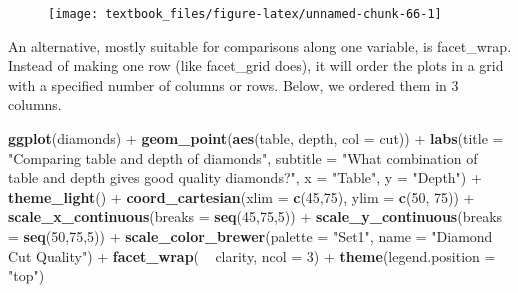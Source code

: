 \documentclass[]{tufte-book}
\newenvironment{Shaded}{}{}
\newcommand{\DataTypeTok}[1]{\textcolor[rgb]{0.56,0.13,0.00}{#1}}
\newcommand{\DecValTok}[1]{\textcolor[rgb]{0.25,0.63,0.44}{#1}}
\newcommand{\KeywordTok}[1]{\textcolor[rgb]{0.00,0.44,0.13}{\textbf{#1}}}
\newcommand{\NormalTok}[1]{#1}
\newcommand{\OperatorTok}[1]{\textcolor[rgb]{0.40,0.40,0.40}{#1}}
\newcommand{\StringTok}[1]{\textcolor[rgb]{0.25,0.44,0.63}{#1}}
\begin{document}
\begin{figure}
\texttt{[image: textbook\_files/figure-latex/unnamed-chunk-66-1]} \end{figure}

An alternative, mostly suitable for comparisons along one variable, is facet\_wrap. Instead of making one row (like facet\_grid does), it will order the plots in a grid with a specified number of columns or rows. Below, we ordered them in 3 columns.

\begin{Shaded}
\begin{Highlighting}[]
\KeywordTok{ggplot}\NormalTok{(diamonds) }\OperatorTok{+}
\StringTok{    }\KeywordTok{geom_point}\NormalTok{(}\KeywordTok{aes}\NormalTok{(table, depth, }\DataTypeTok{col =}\NormalTok{ cut)) }\OperatorTok{+}\StringTok{ }
\StringTok{    }\KeywordTok{labs}\NormalTok{(}\DataTypeTok{title =} \StringTok{"Comparing table and depth of diamonds"}\NormalTok{,}
         \DataTypeTok{subtitle =} \StringTok{"What combination of table and depth gives good quality diamonds?"}\NormalTok{,}
         \DataTypeTok{x =} \StringTok{"Table"}\NormalTok{,}
         \DataTypeTok{y =} \StringTok{"Depth"}\NormalTok{) }\OperatorTok{+}
\StringTok{    }\KeywordTok{theme_light}\NormalTok{() }\OperatorTok{+}
\StringTok{    }\KeywordTok{coord_cartesian}\NormalTok{(}\DataTypeTok{xlim =} \KeywordTok{c}\NormalTok{(}\DecValTok{45}\NormalTok{,}\DecValTok{75}\NormalTok{), }\DataTypeTok{ylim =} \KeywordTok{c}\NormalTok{(}\DecValTok{50}\NormalTok{, }\DecValTok{75}\NormalTok{)) }\OperatorTok{+}
\StringTok{    }\KeywordTok{scale_x_continuous}\NormalTok{(}\DataTypeTok{breaks =} \KeywordTok{seq}\NormalTok{(}\DecValTok{45}\NormalTok{,}\DecValTok{75}\NormalTok{,}\DecValTok{5}\NormalTok{)) }\OperatorTok{+}
\StringTok{    }\KeywordTok{scale_y_continuous}\NormalTok{(}\DataTypeTok{breaks =} \KeywordTok{seq}\NormalTok{(}\DecValTok{50}\NormalTok{,}\DecValTok{75}\NormalTok{,}\DecValTok{5}\NormalTok{)) }\OperatorTok{+}
\StringTok{    }\KeywordTok{scale_color_brewer}\NormalTok{(}\DataTypeTok{palette =} \StringTok{"Set1"}\NormalTok{, }\DataTypeTok{name =} \StringTok{"Diamond Cut Quality"}\NormalTok{) }\OperatorTok{+}
\StringTok{    }\KeywordTok{facet_wrap}\NormalTok{( }\OperatorTok{~}\StringTok{ }\NormalTok{clarity, }\DataTypeTok{ncol =} \DecValTok{3}\NormalTok{) }\OperatorTok{+}
\StringTok{    }\KeywordTok{theme}\NormalTok{(}\DataTypeTok{legend.position =} \StringTok{"top"}\NormalTok{)}
\end{Highlighting}
\end{Shaded}
\end{document}
